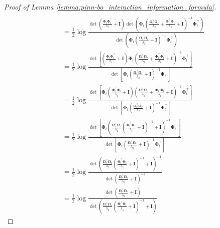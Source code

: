 \begin{proof}[Proof of Lemma \ref{lemma:pinn-bo_interaction_information_formula}]
\begin{align}
\\
        & = \frac{1}{2}\log \frac{ \det (\frac{\boldsymbol{\Phi}_t\boldsymbol{\Phi}_t^\top}{\lambda_1} +\mathbf{I})
        \det(\boldsymbol{\Phi}_t \left(\frac{\boldsymbol{\Omega}_r^\top\boldsymbol{\Omega}_r}{\lambda_2}+\frac{\boldsymbol{\Phi}_t^\top \boldsymbol{\Phi}_t} {\lambda_1} + \mathbf{I}\right)^{-1} \boldsymbol{\Phi}_t^\top)
        }{\det(\boldsymbol{\Phi}_t \left(\frac{\boldsymbol{\Omega}_r^\top \boldsymbol{\Omega}_r}{\lambda_2} + \mathbf{I}\right)^{-1} \boldsymbol{\Phi}_t^\top)}  \nonumber
\\ 
        & = \frac{1}{2}\log \frac{\det[\left(\frac{\boldsymbol{\Phi}_t\boldsymbol{\Phi}_t^\top}{\lambda_1} +\mathbf{I}\right) \boldsymbol{\Phi}_t \left(\frac{\boldsymbol{\Omega}_r^\top\boldsymbol{\Omega}_r}{\lambda_2}+\frac{\boldsymbol{\Phi}_t^\top \boldsymbol{\Phi}_t} {\lambda_1} + \mathbf{I}\right)^{-1}\boldsymbol{\Phi}_t^\top]}
        {\det[ \boldsymbol{\Phi}_t \left(\frac{\boldsymbol{\Omega}_r^\top \boldsymbol{\Omega}_r}{\lambda_2} + \mathbf{I}\right)^{-1} \boldsymbol{\Phi}_t^\top]} \nonumber
\\ 
        & = \frac{1}{2}\log \frac{
        \det[\boldsymbol{\Phi}_t \left(\frac{\boldsymbol{\Phi}_t^\top\boldsymbol{\Phi}_t}{\lambda_1} +\mathbf{I}\right)  \left(\frac{\boldsymbol{\Omega}_r^\top\boldsymbol{\Omega}_r}{\lambda_2}+\frac{\boldsymbol{\Phi}_t^\top \boldsymbol{\Phi}_t} {\lambda_1} + \mathbf{I}\right)^{-1}\boldsymbol{\Phi}_t^\top]}
        {\det[ \boldsymbol{\Phi}_t \left(\frac{\boldsymbol{\Omega}_r^\top \boldsymbol{\Omega}_r}{\lambda_2} + \mathbf{I}\right)^{-1} \boldsymbol{\Phi}_t^\top]} \nonumber
\\
        & = \frac{1}{2}\log \frac{
        \det[\boldsymbol{\Phi}_t  \left(\frac{\boldsymbol{\Omega}_r^\top \boldsymbol{\Omega}_r}{\lambda_2} \left(\frac{\boldsymbol{\Phi}_t^\top\boldsymbol{\Phi}_t}{\lambda_1} +\mathbf{I}\right)^{-1} + \mathbf{I}\right)^{-1}\boldsymbol{\Phi}_t^\top]}
        {\det[ \boldsymbol{\Phi}_t \left(\frac{\boldsymbol{\Omega}_r^\top \boldsymbol{\Omega}_r}{\lambda_2} + \mathbf{I}\right)^{-1} \boldsymbol{\Phi}_t^\top]} \label{Eqn:det_division}
\\
        &= \frac{1}{2}\log \frac{\det\left(\frac{\boldsymbol{\Omega}_r^\top \boldsymbol{\Omega}_r}{\lambda_2} \left(\frac{\boldsymbol{\Phi}_t^\top\boldsymbol{\Phi}_t}{\lambda_1} +\mathbf{I}\right)^{-1} + \mathbf{I}\right)^{-1}}{\det (\frac{\boldsymbol{\Omega}_r^\top\boldsymbol{\Omega}_r}{\lambda_2} + \mathbf{I})^{-1}} \nonumber
\\
        & = \frac{1}{2}\log \frac{\det (\frac{\boldsymbol{\Omega}_r^\top\boldsymbol{\Omega}_r}{\lambda_2} + \mathbf{I})}{\det\left(\frac{\boldsymbol{\Omega}_r^\top \boldsymbol{\Omega}_r}{\lambda_2} \left(\frac{\boldsymbol{\Phi}_t^\top\boldsymbol{\Phi}_t}{\lambda_1} +\mathbf{I}\right)^{-1} + \mathbf{I}\right)} \nonumber

\end{align}
\end{proof}
